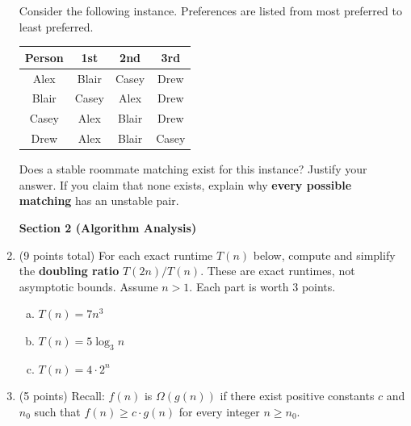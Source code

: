 \documentclass[11pt]{article}
\newcommand{\sectiontitle}[1]{\begin{center}\LARGE\textbf{#1}\end{center}}
\begin{document}
\begin{enumerate}
Consider the following instance. Preferences are listed from most preferred to least preferred.
\begin{center}
\begin{tabular}{c|ccc}
Person & 1st & 2nd & 3rd\\\hline
Alex & Blair & Casey & Drew\\
Blair & Casey & Alex & Drew\\
Casey & Alex & Blair & Drew\\
Drew & Alex & Blair & Casey\\
\end{tabular}
\end{center}
Does a stable roommate matching exist for this instance? Justify your answer. If you claim that none exists, explain why \textbf{every possible matching} has an unstable pair.
\vfill
\newpage
\sectiontitle{Section 2 (Algorithm Analysis)}
\item (9 points total) For each exact runtime $T(n)$ below, compute and simplify the \textbf{doubling ratio} $T(2n)/T(n)$. These are exact runtimes, not asymptotic bounds. Assume $n>1$. Each part is worth 3 points.
\begin{enumerate}[(a)]
\item $T(n)=7n^3$
\vspace{1in}
\item $T(n)=5\log_3 n$
\vspace{2in}
\item $T(n)=4\cdot 2^n$
\vspace{1in}
\end{enumerate}
\item (5 points) Recall: $f(n)$ is $\Omega(g(n))$ if there exist positive constants $c$ and $n_0$ such that $f(n)\geq c\cdot g(n)$ for every integer $n\geq n_0$.



\end{enumerate}
\end{document}
